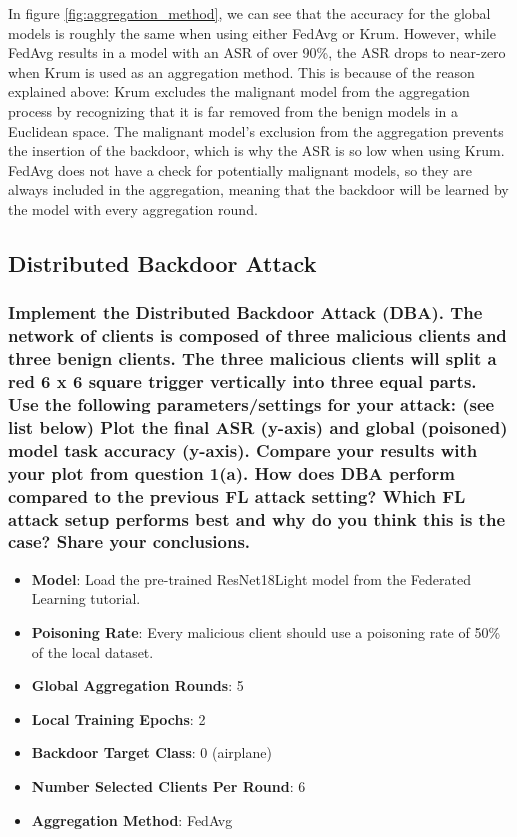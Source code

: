 \documentclass{article}
\begin{document}
In figure \ref{fig:aggregation_method}, we can see that the accuracy for the global models is roughly the same when using either FedAvg or Krum.
However, while FedAvg results in a model with an ASR of over 90\%, the ASR drops to near-zero when Krum is used as an aggregation method.
This is because of the reason explained above: Krum excludes the malignant model from the aggregation process by recognizing that it is far removed from the benign models in a Euclidean space.
The malignant model's exclusion from the aggregation prevents the insertion of the backdoor, which is why the ASR is so low when using Krum.
FedAvg does not have a check for potentially malignant models, so they are always included in the aggregation, meaning that the backdoor will be learned by the model with every aggregation round.

\subsection{Distributed Backdoor Attack}
\subsubsection{Implement the Distributed Backdoor Attack (DBA). The network
of clients is composed of three malicious clients and three benign clients. The
three malicious clients will split a red 6 x 6 square trigger vertically into three
equal parts. Use the following parameters/settings for your attack: (see list below)
Plot the final ASR (y-axis) and global (poisoned) model task accuracy (y-axis).
Compare your results with your plot from question 1(a). How does DBA perform
compared to the previous FL attack setting? Which FL attack setup performs
best and why do you think this is the case? Share your conclusions.}
\begin{itemize}
    \item \textbf{Model}: Load the pre-trained ResNet18Light model from the Federated
    Learning tutorial.
    \item \textbf{Poisoning Rate}: Every malicious client should use a poisoning rate of
    50\% of the local dataset.
    \item \textbf{Global Aggregation Rounds}: 5
    \item \textbf{Local Training Epochs}: 2
    \item \textbf{Backdoor Target Class}: 0 (airplane)
    \item \textbf{Number Selected Clients Per Round}: 6
    \item \textbf{Aggregation Method}: FedAvg
\end{itemize}
\end{document}
